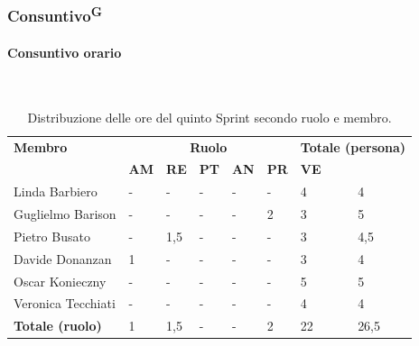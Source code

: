 \documentclass[8pt]{article}
\newcommand{\glossterm}[1]{#1\textsuperscript{G}} %
\newcommand{\subsubsubsection}[1]{\paragraph{#1}\mbox{}\\}
\begin{document}
\subsubsection{\glossterm{Consuntivo}}
\subsubsubsection{Consuntivo orario}
\begin{table}[ht!]
	\centering
	\begin{tabular}{p{3cm} p{1.4cm} p{1.6cm} p{1.7cm} p{1.4cm} p{1.4cm} p{1.5cm} p{2cm}}
		\toprule
        \textbf{Membro} & \multicolumn{5}{c}{\textbf{Ruolo}} & \multicolumn{2}{r}{\textbf{Totale (persona)}}\\
		& \textbf{AM} & \textbf{RE} & \textbf{PT} & \textbf{AN} & \textbf{PR} & \textbf{VE}\\
		\midrule
        Linda Barbiero          & -     & -     & -     & -     & -     & 4     & 4 \\
        Guglielmo Barison       & -     & -     & -     & -     & 2     & 3     & 5\\
        Pietro Busato           & -     & 1,5   & -     & -     & -     & 3     & 4,5 \\
        Davide Donanzan         & 1     & -     & -     & -     & -     & 3     & 4 \\
        Oscar Konieczny         & -     & -     & -     & -     & -     & 5     & 5 \\
        Veronica Tecchiati      & -     & -     & -     & -     & -     & 4     & 4 \\
        \bottomrule
        \textbf{Totale (ruolo)} & 1     & 1,5   & -    & -      & 2  & 22   & 26,5 \\
		\bottomrule
	\end{tabular}
	\caption{Distribuzione delle ore del quinto Sprint secondo ruolo e membro.}
	\label{table:Distribuzione delle ore del quinto Sprint secondo ruolo e membr}
\end{table}
\end{document}
